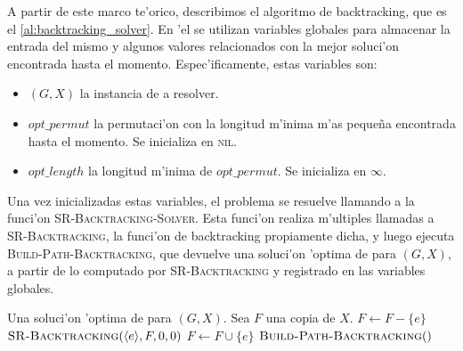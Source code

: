 A partir de este marco te'orico, describimos el algoritmo de backtracking, que es el \autoref{al:backtracking_solver}. En 'el se utilizan variables globales para almacenar la entrada del mismo y algunos valores relacionados con la mejor soluci'on encontrada hasta el momento. Espec'ificamente, estas variables son:

\begin{itemize}
\item $(G, X)$ la instancia de  a resolver.
\item $opt\_permut$ la permutaci'on con la longitud m'inima m'as peque\~na encontrada hasta el momento. Se inicializa en \textsc{nil}.
\item $opt\_length$ la longitud m'inima de $opt\_permut$. Se inicializa en $\infty$.
\end{itemize}

Una vez inicializadas estas variables, el problema se resuelve llamando a la funci'on \textsc{SR-Backtracking-Solver}. Esta funci'on realiza m'ultiples llamadas a \textsc{SR-Backtracking}, la funci'on de backtracking propiamente dicha, y luego ejecuta \textsc{Build-Path-Backtracking}, que devuelve una soluci'on 'optima de  para $(G, X)$, a partir de lo computado por \textsc{SR-Backtracking} y registrado en las variables globales.

\begin{algorithm}
  \caption{}
  \label{al:backtracking_solver}
  \begin{algorithmic}[1]
  	\Ensure Una soluci'on 'optima de  para $(G, X)$.
	\State Sea $F$ una copia de $X$.
		\State $F \gets F - \{e\}$
		\State $\textsc{SR-Backtracking}(\langle e \rangle, F, 0, 0)$
		\State $F \gets F \cup \{e\}$
	\EndFor
	\Return $\textsc{Build-Path-Backtracking}()$
	\EndFunction
  \end{algorithmic}
\end{algorithm}

